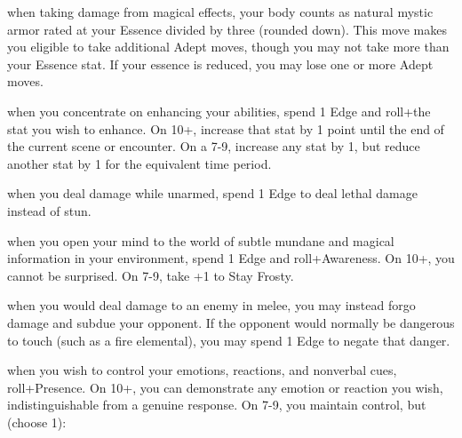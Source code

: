 \begin{dossier}
\hspace{.5cm}%
\vrule width 2pt
\hspace{.3cm}%
\begin{dossiermovebar}
\fontsize{9pt}{1em}\selectfont
\setlength{\parskip}{.2cm}
 when taking damage
from magical effects, your body counts as natural
mystic armor rated at your Essence divided by
three (rounded down). This move makes you eligible
to take additional Adept moves, though you may not
take more than your Essence stat. If your essence
is reduced, you may lose one or more Adept moves.

 when you concentrate on enhancing your abilities, spend 1 Edge 
and roll+the stat you wish to enhance. On 10+, increase that stat by 1 point until the end of 
the current scene or encounter. On a 7-9, increase any stat by 1, but reduce another stat by 1 
for the equivalent time period. 

 when you deal damage while unarmed, spend 1 Edge to deal lethal 
  damage instead of stun. 

   when you open your mind to the world of subtle mundane and magical 
    information in your environment, spend 1 Edge and roll+Awareness. On 10+, you cannot 
    be surprised. On 7-9, take +1 to Stay Frosty. 

     when you would deal damage to an enemy in melee, you may 
      instead forgo damage and subdue your opponent. If the opponent would normally be dangerous to touch (such as a fire elemental), you may spend 1 Edge to negate that danger. 

       when you wish to control your emotions, reactions, and nonverbal 
        cues, roll+Presence. On 10+, you can
        demonstrate any emotion or reaction you
        wish, indistinguishable from a genuine
        response. On 7-9, you maintain control,
        but (choose 1): 
\begin{moveoptions}


\end{moveoptions}


\end{dossiermovebar}
\end{dossier}
